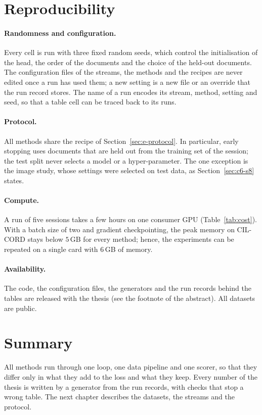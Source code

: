 \section{Reproducibility}
\label{sec:c4-s4}

\paragraph{Randomness and configuration.} Every cell is run with three fixed random seeds,
which control the initialisation of the head, the order of the documents and the choice of
the held-out documents. The configuration files of the streams, the methods and the
recipes are never edited once a run has used them; a new setting is a new file or an
override that the run record stores. The name of a run encodes its stream, method, setting
and seed, so that a table cell can be traced back to its runs.

\paragraph{Protocol.} All methods share the recipe of Section~\ref{sec:e-protocol}. In
particular, early stopping uses documents that are held out from the training set of the
session; the test split never selects a model or a hyper-parameter. The one exception is
the image study, whose settings were selected on test data, as Section~\ref{sec:c6-s8}
states.

\paragraph{Compute.} A run of five sessions takes a few hours on one consumer GPU
(Table~\ref{tab:cost}). With a batch size of two and gradient checkpointing, the peak
memory on CIL-CORD stays below $5$\,GB for every method; hence, the experiments can be repeated on a
single card with $6$\,GB of memory.

\paragraph{Availability.} The code, the configuration files, the generators and the run
records behind the tables are released with the thesis (see the footnote of the abstract).
All datasets are public.

\section{Summary}
\label{sec:c4-s5}

All methods run through one loop, one data pipeline and one scorer, so that they differ
only in what they add to the loss and what they keep. Every number of the thesis is
written by a generator from the run records, with checks that stop a wrong table. The next
chapter describes the datasets, the streams and the protocol.
